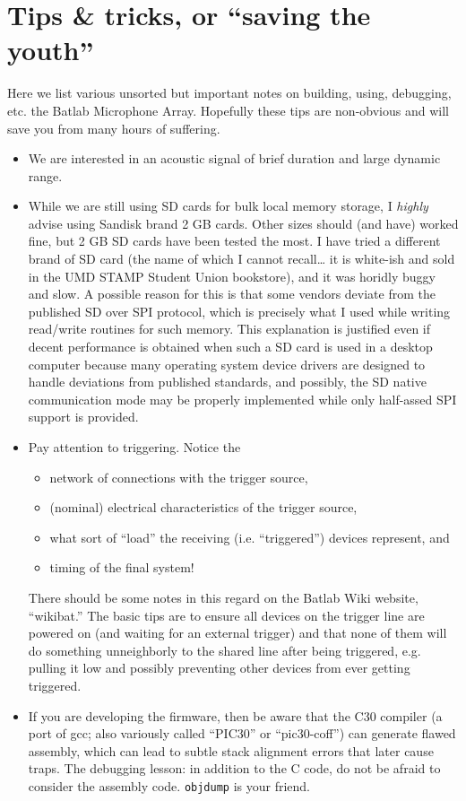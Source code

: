 \documentclass[letterpaper]{article}
\begin{document}
\section{Tips \& tricks, or ``saving the youth''}
\label{tips:sec}

Here we list various unsorted but important notes on building, using,
debugging, etc. the Batlab Microphone Array. Hopefully these tips are
non-obvious and will save you from many hours of suffering.

\begin{itemize}
\item We are interested in an acoustic signal of brief duration and
  large dynamic range. 

\item While we are still using SD cards for bulk local memory storage,
  I \textit{highly} advise using Sandisk brand 2 GB cards. Other sizes
  should (and have) worked fine, but 2 GB SD cards have been tested
  the most. I have tried a different brand of SD card (the name of
  which I cannot recall\ldots{} it is white-ish and sold in the UMD
  STAMP Student Union bookstore), and it was horidly buggy and slow. A
  possible reason for this is that some vendors deviate from the
  published SD over SPI protocol, which is precisely what I used while
  writing read/write routines for such memory. This explanation is
  justified even if decent performance is obtained when such a SD card
  is used in a desktop computer because many operating system device
  drivers are designed to handle deviations from published standards,
  and possibly, the SD native communication mode may be properly
  implemented while only half-assed SPI support is provided.

\item Pay attention to triggering. Notice the
\begin{itemize}
\item network of connections with the trigger source,
\item (nominal) electrical characteristics of the trigger source,
\item what sort of ``load'' the receiving (i.e. ``triggered'') devices
  represent, and
\item timing of the final system!
\end{itemize}
There should be some notes in this regard on the Batlab Wiki website,
``wikibat.'' The basic tips are to ensure all devices on the trigger
line are powered on (and waiting for an external trigger) and that
none of them will do something unneighborly to the shared line after
being triggered, e.g. pulling it low and possibly preventing other
devices from ever getting triggered.

\item If you are developing the firmware, then be aware that the C30
  compiler (a port of gcc; also variously called ``PIC30'' or
  ``pic30-coff'') can generate flawed assembly, which can lead to
  subtle stack alignment errors that later cause traps. The debugging
  lesson: in addition to the C code, do not be afraid to consider the
  assembly code. \texttt{objdump} is your friend.

\end{itemize}
\end{document}
